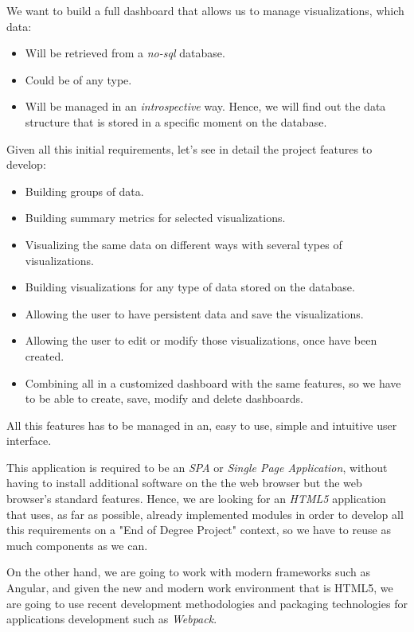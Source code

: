 \documentclass[a4paper, 12pt, english]{book}
\begin{document}
We want to build a full dashboard that allows us to manage visualizations, which data:
\begin{itemize}
    \item Will be retrieved from a \textit{no-sql} database.
    \item Could be of any type.
    \item Will be managed in an \textit{introspective} way. Hence, we will find out the data structure that is stored in a specific moment on the database.
\end{itemize}
Given all this initial requirements, let's see in detail the project features to develop:
\begin{itemize}
    \item Building groups of data.
    \item Building summary metrics for selected visualizations.
    \item Visualizing the same data on different ways with several types of visualizations.
    \item Building visualizations for any type of data stored on the database.
    \item Allowing the user to have persistent data and save the visualizations.
    \item Allowing the user to edit or modify those visualizations, once have been created.
    \item Combining all in a customized dashboard with the same features, so we have to be able to create, save, modify and delete dashboards.
\end{itemize}
All this features has to be managed in an, easy to use, simple and intuitive user interface.

This application is required to be an \textit{SPA} or \textit{Single Page Application}, without having to install additional software on the the web browser but the web browser's standard features. Hence, we are looking for an \textit{HTML5} application that uses, as far as possible, already implemented modules in order to develop all this requirements on a "End of Degree Project" context, so we have to reuse as much components as we can.

On the other hand, we are going to work with modern frameworks such as Angular, and given the new and modern work environment that is HTML5, we are going to use recent  development methodologies and packaging technologies for applications development such as \textit{Webpack}.


\end{document}
